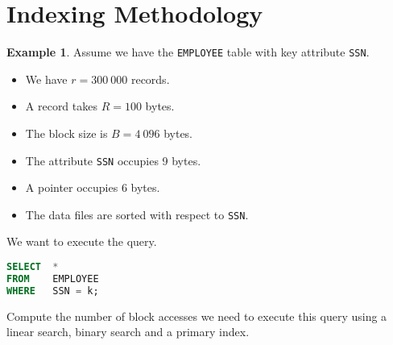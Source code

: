 \documentclass[a4paper, openany]{memoir}
\theoremstyle{definition}
\newtheorem{example}[subsection]{Example}
\begin{document}
\section{Indexing Methodology}
\begin{example}
    Assume we have the \texttt{EMPLOYEE} table with key attribute \texttt{SSN}.
    \begin{itemize}
        \item We have $r = 300 \ 000$ records.
        \item A record takes $R = 100$ bytes.
        \item The block size is $B = 4 \ 096$ bytes.
        \item The attribute \texttt{SSN} occupies 9 bytes.
        \item A pointer occupies 6 bytes.
        \item The data files are sorted with respect to \texttt{SSN}.
    \end{itemize}
    We want to execute the query.
\begin{lstlisting}[language=SQL]
SELECT  *
FROM    EMPLOYEE
WHERE   SSN = k;
\end{lstlisting}
    Compute the number of block accesses we need to execute this query using a linear search, binary search and a primary index.
\end{example}
\end{document}
